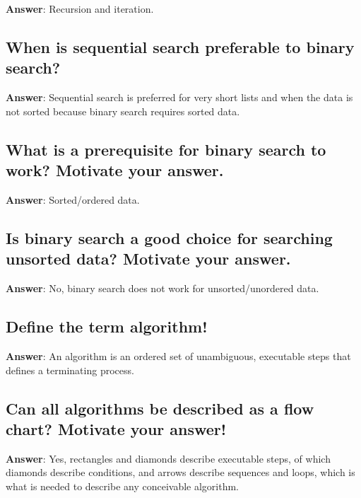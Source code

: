 \documentclass[a4paper,11pt,oneside]{article}
\begin{document}
\begin{sloppypar}
\textbf{Answer}: Recursion and iteration.



\subsection{When is sequential search preferable to binary search?}

\label{q:183:sa:en:True}

\textbf{Answer}: Sequential search is preferred for very short lists and when the data is not sorted because binary search requires sorted data.



\subsection{What is a prerequisite for binary search to work? Motivate your answer.}

\label{q:184:sa:en:True}

\textbf{Answer}: Sorted/ordered data.



\subsection{Is binary search a good choice for searching unsorted data? Motivate your answer.}

\label{q:185:sa:en:True}

\textbf{Answer}: No, binary search does not work for unsorted/unordered data.



\subsection{Define the term algorithm!}

\label{q:186:sa:en:True}

\textbf{Answer}: An algorithm is an ordered set of unambiguous, executable steps that defines a terminating process.



\subsection{Can all algorithms be described as a flow chart? Motivate your answer!}

\label{q:187:sa:en:True}

\textbf{Answer}: Yes, rectangles and diamonds describe executable steps, of which diamonds describe conditions, and arrows describe sequences and loops, which is what is needed to describe any conceivable algorithm.




\end{sloppypar}
\end{document}
